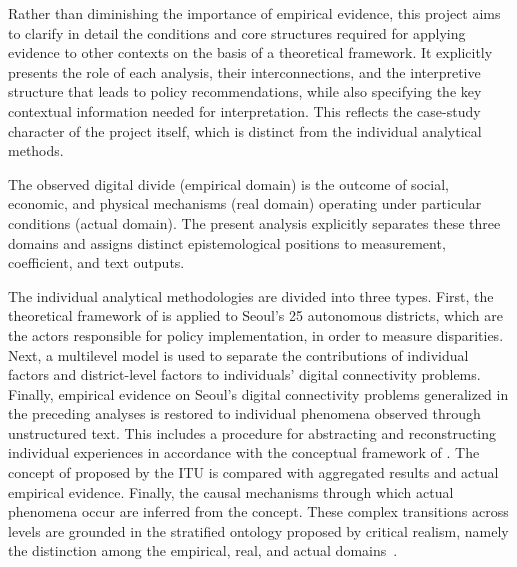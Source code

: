 Rather than diminishing the importance of empirical evidence, this project aims to clarify in detail the conditions and core structures required for applying evidence to other contexts on the basis of a theoretical framework. It explicitly presents the role of each analysis, their interconnections, and the interpretive structure that leads to policy recommendations, while also specifying the key contextual information needed for interpretation. This reflects the case-study character of the project itself, which is distinct from the individual analytical methods.

\begin{metabox}[title={Metatheory \textperiodcentered{} Stratified Ontology --- Empirical, Actual, and Real Domains}]
The observed digital divide (empirical domain) is the outcome of social, economic, and physical mechanisms (real domain) operating under particular conditions (actual domain). The present analysis explicitly separates these three domains and assigns distinct epistemological positions to measurement, coefficient, and text outputs.
\end{metabox}

The individual analytical methodologies are divided into three types. First, the theoretical framework of \umc{} is applied to Seoul's 25 autonomous districts, which are the actors responsible for policy implementation, in order to measure disparities. Next, a multilevel model is used to separate the contributions of individual factors and district-level factors to individuals' digital connectivity problems. Finally, empirical evidence on Seoul's digital connectivity problems generalized in the preceding analyses is restored to individual phenomena observed through unstructured text. This includes a procedure for abstracting and reconstructing individual experiences in accordance with the conceptual framework of \umc{}. The concept of \umc{} proposed by the ITU is compared with aggregated results and actual empirical evidence. Finally, the causal mechanisms through which actual phenomena occur are inferred from the concept. These complex transitions across levels are grounded in the stratified ontology proposed by critical realism, namely the distinction among the empirical, real, and actual domains~\citep{Bhaskar1975}.

